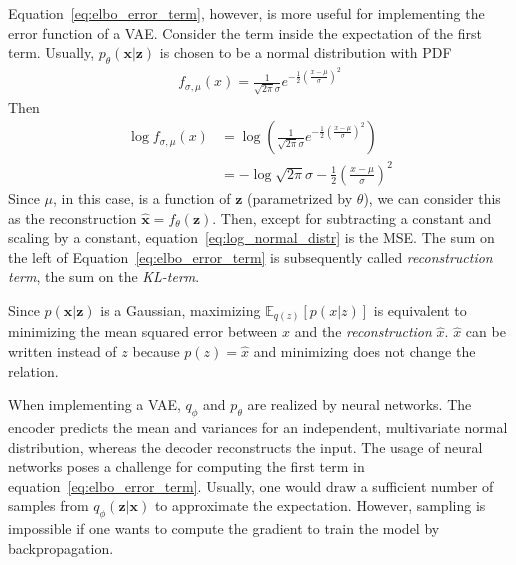 Equation~\ref{eq:elbo_error_term}, however, is more useful for implementing the error function of a \ac{VAE}.
Consider the term inside the expectation of the first term.
Usually, $p_\theta(\bm{x}|\bm{z})$ is chosen to be a normal distribution with \ac{PDF}
\begin{align}
    f_{\sigma,\mu}(x) = \frac{1}{\sqrt{2\pi}\sigma}e^{-\frac{1}{2}\left( \frac{x-\mu}{\sigma} \right)^2}
\end{align}
Then
\begin{align}
    \log f_{\sigma,\mu}(x) &= \log \left( \frac{1}{\sqrt{2\pi}\sigma}e^{-\frac{1}{2}\left( \frac{x-\mu}{\sigma} \right)^2} \right)\\
    &= - \log \sqrt{2\pi}\sigma -\frac{1}{2}\left( \frac{x-\mu}{\sigma} \right)^2 \label{eq:log_normal_distr}
\end{align}
Since $\mu$, in this case, is a function of $\bm{z}$ (parametrized by $\theta$), we can consider this as the reconstruction $\hat{\bm{x}} = f_\theta(\bm{z})$.
Then, except for subtracting a constant and scaling by a constant, equation~\ref{eq:log_normal_distr} is the \ac{MSE}.
The sum on the left of Equation~\ref{eq:elbo_error_term} is subsequently called \textit{reconstruction term}, the sum on the \textit{\ac{KL}-term}.

Since $p(\bm{x}|\bm{z})$ is a Gaussian, maximizing $\mathbb{E}_{q(z)} \left[ p(x|z) \right]$ is equivalent to minimizing the mean squared error between $x$ and the \textit{reconstruction} $\hat{x}$.
$\hat{x}$ can be written instead of $z$ because $p(z) = \hat{x}$ and minimizing does not change the relation.

When implementing a \ac{VAE}, $q_\phi$ and $p_\theta$ are realized by neural networks.
The encoder predicts the mean and variances for an independent, multivariate normal distribution, whereas the decoder reconstructs the input.
The usage of neural networks poses a challenge for computing the first term in equation~\ref{eq:elbo_error_term}.
Usually, one would draw a sufficient number of samples from $q_\phi(\bm{z}|\bm{x})$ to approximate the expectation.
However, sampling is impossible if one wants to compute the gradient to train the model by backpropagation.

